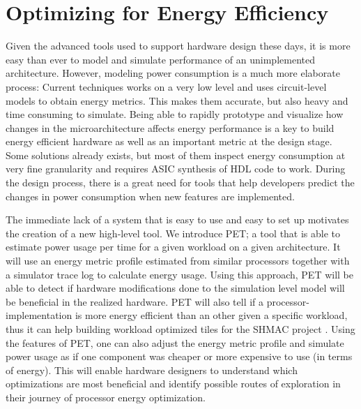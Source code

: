 \section{Optimizing for Energy Efficiency}

Given the advanced tools used to support hardware design these days, it is more
easy than ever to model and simulate performance of an unimplemented
architecture. However, modeling power consumption is a much more elaborate
process: Current techniques works on a very low level and uses circuit-level
models to obtain energy metrics. This makes them accurate, but also heavy and
time consuming to simulate. Being able to rapidly prototype and visualize how
changes in the microarchitecture affects energy performance is a key to build
energy efficient hardware as well as an important metric at the design stage. Some
solutions already exists, but most of them inspect energy consumption at very
fine granularity and requires ASIC synthesis of HDL code to work. During the
design process, there is a great need for tools that help developers predict
the changes in power consumption when new features are implemented.

The immediate lack of a system that is easy to use and easy to set up motivates
the creation of a new high-level tool. We introduce PET; a tool that is able to
estimate power usage per time for a given workload on a given architecture. It
will use an energy metric profile estimated from similar processors together
with a simulator trace log to calculate energy usage. Using this approach, PET
will be able to detect if hardware modifications done to the simulation level
model will be beneficial in the realized hardware. PET will also tell if a
processor-implementation is more energy efficient than an other given a specific
workload, thus it can help building workload optimized tiles for the SHMAC
project \cite{shmacwebpage}. Using the features of PET, one can also adjust the
energy metric profile and simulate power usage as if one component was cheaper
or more expensive to use (in terms of energy). This will enable hardware designers to
understand which optimizations are most beneficial and identify possible routes
of exploration in their journey of processor energy optimization.




